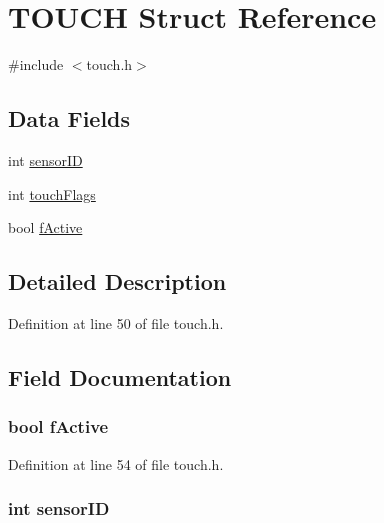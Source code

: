\hypertarget{struct_t_o_u_c_h}{
\section{TOUCH Struct Reference}
\label{struct_t_o_u_c_h}
}


{\ttfamily \#include $<$touch.h$>$}

\subsection*{Data Fields}
\begin{DoxyCompactItemize}
\item 
int \hyperlink{struct_t_o_u_c_h_a4f5a5e2cb7ee061dd0bd29b7086d89ac}{sensorID}
\item 
int \hyperlink{struct_t_o_u_c_h_a123437254b30d7234872a05229e1d079}{touchFlags}
\item 
bool \hyperlink{struct_t_o_u_c_h_a2d81accfd33444d13bf05827c87d6abd}{fActive}
\end{DoxyCompactItemize}


\subsection{Detailed Description}


Definition at line 50 of file touch.h.



\subsection{Field Documentation}
\hypertarget{struct_t_o_u_c_h_a2d81accfd33444d13bf05827c87d6abd}{
\subsubsection[{fActive}]{\setlength{\rightskip}{0pt plus 5cm}bool {\bf fActive}}}
\label{struct_t_o_u_c_h_a2d81accfd33444d13bf05827c87d6abd}


Definition at line 54 of file touch.h.

\hypertarget{struct_t_o_u_c_h_a4f5a5e2cb7ee061dd0bd29b7086d89ac}{
\subsubsection[{sensorID}]{\setlength{\rightskip}{0pt plus 5cm}int {\bf sensorID}}}
\label{struct_t_o_u_c_h_a4f5a5e2cb7ee061dd0bd29b7086d89ac}


